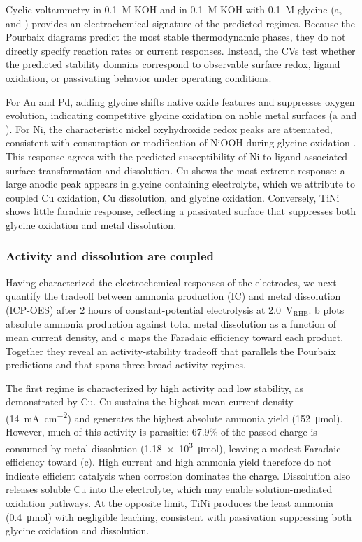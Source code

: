\documentclass[twoside,twocolumn,9pt]{article}
\begin{document}
Cyclic voltammetry in 0.1~M KOH and in 0.1~M KOH with 0.1~M glycine (a, and ) provides an electrochemical signature of the predicted regimes. Because the Pourbaix diagrams predict the most stable thermodynamic phases, they do not directly specify reaction rates or current responses. Instead, the CVs test whether the predicted stability domains correspond to observable surface redox, ligand oxidation, or passivating behavior under operating conditions.

For Au and Pd, adding glycine shifts native oxide features and suppresses oxygen evolution, indicating competitive glycine oxidation on noble metal surfaces \cite{Chadderdon2014,Arulmani2019} (a and ). For Ni, the characteristic nickel oxyhydroxide redox peaks are attenuated, consistent with consumption or modification of NiOOH during glycine oxidation \cite{Boggs2009}. This response agrees with the predicted susceptibility of Ni to ligand associated surface transformation and dissolution. Cu shows the most extreme response: a large anodic peak appears in glycine containing electrolyte, which we attribute to coupled Cu oxidation, Cu dissolution, and glycine oxidation. Conversely, TiNi shows little faradaic response, reflecting a passivated surface that suppresses both glycine oxidation and metal dissolution.

\subsubsection{Activity and dissolution are coupled}

Having characterized the electrochemical responses of the electrodes, we next quantify the tradeoff between ammonia production (IC) and metal dissolution (ICP-OES) after 2 hours of constant-potential electrolysis at 2.0~V$_{\mathrm{RHE}}$. b plots absolute ammonia production against total metal dissolution as a function of mean current density, and c maps the Faradaic efficiency toward each product. Together they reveal an activity-stability tradeoff that parallels the Pourbaix predictions and that spans three broad activity regimes.


The first regime is characterized by high activity and low stability, as demonstrated by Cu. Cu sustains the highest mean current density (\SI{14}{\milli\ampere\per\square\centi\meter}) and generates the highest absolute ammonia yield (152~\si{\micro mol}). However, much of this activity is parasitic: 67.9\% of the passed charge is consumed by metal dissolution (\num{1.18e3}~\si{\micro mol}), leaving a modest Faradaic efficiency toward  (c). High current and high ammonia yield therefore do not indicate efficient catalysis when corrosion dominates the charge. Dissolution also releases soluble Cu into the electrolyte, which may enable solution-mediated oxidation pathways.  At the opposite limit, TiNi produces the least ammonia (0.4~\si{\micro mol}) with negligible leaching, consistent with passivation suppressing both glycine oxidation and dissolution.
\end{document}
